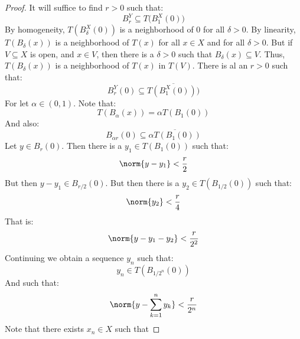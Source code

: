     \begin{proof}
        It will suffice to find $r>0$ such that:
        \begin{equation}
            B_{r}^{Y}\subseteq
            T\Big(B_{1}^{X}(0)\Big)
        \end{equation}
        By homogeneity, $T(B_{\delta}^{X}(0))$ is a
        neighborhood of $0$ for all $\delta>0$. By linearity,
        $T(B_{\delta}(x))$ is a neighborhood of
        $T(x)$ for all $x\in{X}$ and for all $\delta>0$. But
        if $V\subseteq{X}$ is open, and $x\in{V}$, then there
        is a $\delta>0$ such that $B_{\delta}(x)\subseteq{V}$.
        Thus, $T(B_{\delta}(x))$ is a neighborhood of $T(x)$
        in $T(V)$. There is al an $r>0$ such that:
        \begin{equation}
            B_{r}^{Y}(0)\subseteq
            \overline{T(B_{1}^{X}(0)))}
        \end{equation}
        For let $\alpha\in(0,1)$. Note that:
        \begin{equation}
            T(B_{\alpha}(x))=\alpha{T}(B_{1}(0))
        \end{equation}
        And also:
        \begin{equation}
            B_{\alpha{r}}(0)\subseteq
            \overline{\alpha{T}(B_{1}(0))}
        \end{equation}
        Let $y\in{B}_{r}(0)$. Then there is a
        $y_{1}\in{T(B_{1}(0))}$ such that:
        \begin{equation}
            \norm{y-y_{1}}<\frac{r}{2}
        \end{equation}
        But then $y-y_{1}\in{B}_{r/2}(0)$. But then there is a
        $y_{2}\in{T}(B_{1/2}(0))$ such that:
        \begin{equation}
            \norm{y_{2}}<\frac{r}{4}
        \end{equation}
        That is:
        \begin{equation}
            \norm{y-y_{1}-y_{2}}<\frac{r}{2^{2}}
        \end{equation}
        Continuing we obtain a sequence $y_{n}$ such that:
        \begin{equation}
            y_{n}\in{T}(B_{1/2^{n}}(0))
        \end{equation}
        And such that:
        \begin{equation}
            \norm{y-\sum_{k=1}^{n}y_{k}}<
            \frac{r}{2^{n}}
        \end{equation}
        Note that there exists $x_{n}\in{X}$ such that

\end{proof}
